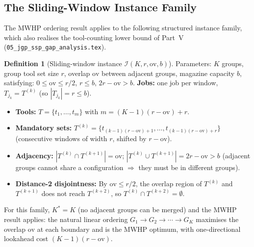 \documentclass[11pt,a4paper]{article}
\theoremstyle{plain}
\theoremstyle{definition}
\newtheorem{definition}[theorem]{Definition}
\newcommand{\Kstar}{K^*}
\begin{document}
\subsection{The Sliding-Window Instance Family}
\label{sec:sliding_window}

The MWHP ordering result applies to the following structured instance family, which
also realises the tool-counting lower bound of Part~V
(\texttt{05\_jgp\_ssp\_gap\_analysis.tex}).

\begin{definition}[Sliding-window instance $\mathcal{I}(K,r,\mathrm{ov},b)$]
Parameters: $K$ groups, group tool set size $r$, overlap $\mathrm{ov}$
between adjacent groups, magazine capacity $b$, satisfying:
$0 \le \mathrm{ov} \le r/2$, $r \le b$, $2r - \mathrm{ov} > b$.
\textbf{Jobs:} one job per window, $T_{j_k}=T^{(k)}$ (so $|T_{j_k}|=r\le b$).
\begin{itemize}
\item \textbf{Tools:} $T = \{t_1,\ldots,t_m\}$ with $m = (K-1)(r-\mathrm{ov})+r$.
\item \textbf{Mandatory sets:} $T^{(k)} = \{t_{(k-1)(r-\mathrm{ov})+1},\ldots,
  t_{(k-1)(r-\mathrm{ov})+r}\}$ (consecutive windows of width $r$, shifted by
  $r-\mathrm{ov}$).
\item \textbf{Adjacency:} $|T^{(k)} \cap T^{(k+1)}| = \mathrm{ov}$;
  $|T^{(k)} \cup T^{(k+1)}| = 2r-\mathrm{ov} > b$ (adjacent groups cannot share
  a configuration $\Rightarrow$ they must be in different groups).
\item \textbf{Distance-2 disjointness:} By $\mathrm{ov} \le r/2$, the overlap
  region of $T^{(k)}$ and $T^{(k+1)}$ does not reach $T^{(k+2)}$, so
  $T^{(k)} \cap T^{(k+2)} = \emptyset$.
\end{itemize}
\end{definition}

For this family, $\Kstar = K$ (no adjacent groups can be merged) and the MWHP
result applies: the natural linear ordering $G_1 \to G_2 \to \cdots \to G_K$
maximises the overlap $\mathrm{ov}$ at each boundary and is the MWHP optimum, with
one-directional lookahead cost $(K-1)(r-\mathrm{ov})$.
\end{document}
